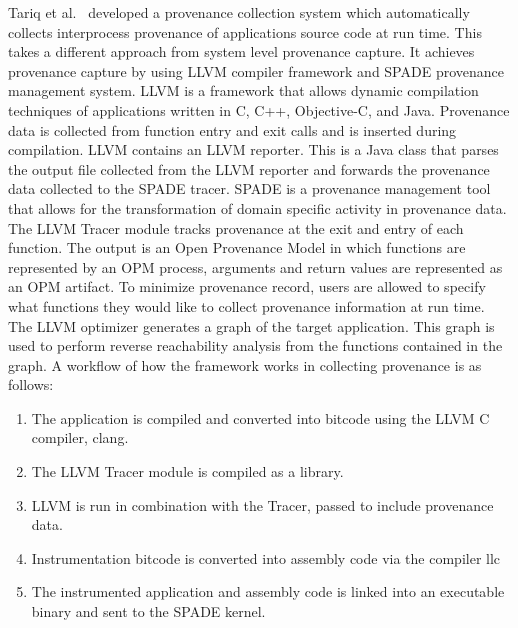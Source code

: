 Tariq et al.~\cite{tariq_towards_2012} developed a provenance collection system which automatically collects interprocess provenance of applications source code at run time. This takes a different approach from system level provenance capture. It achieves provenance capture by using LLVM compiler framework and SPADE provenance management system. LLVM is a framework that allows dynamic compilation techniques of applications written in C, C++, Objective-C, and Java. Provenance data is collected from function entry and exit calls and is inserted during compilation. LLVM contains an LLVM reporter. This is a Java class that parses the output file collected from the LLVM reporter and forwards the provenance data collected to the SPADE tracer. SPADE is a provenance management tool that allows for the transformation of domain specific activity in provenance data. The LLVM Tracer module tracks provenance at the exit and entry of each function. The output is an Open Provenance Model in which functions are represented by an OPM process, arguments and return values are represented as an OPM artifact. To minimize provenance record, users are allowed to specify what functions they would like to collect provenance information at run time. The LLVM optimizer generates a graph of the target application. This graph is used to perform reverse reachability analysis  from the functions contained in the graph. A workflow of how the framework works in collecting provenance is as follows:

\begin{enumerate}


\item The application is compiled and converted into bitcode using the LLVM C compiler, clang.

\item The LLVM Tracer module is compiled as a library.

\item LLVM is run in combination with the Tracer, passed to include provenance data. 

\item Instrumentation bitcode is converted into assembly code via the compiler llc



\item  The instrumented application and assembly code is linked into an executable binary and sent to the SPADE kernel.
\end{enumerate}


